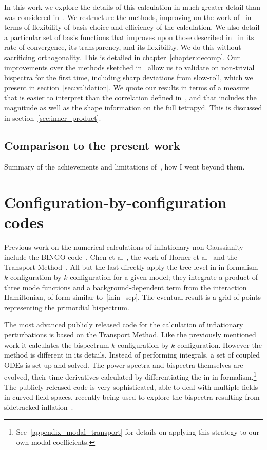 In this work we explore the details of this calculation in much greater detail
than was considered in~\cite{Funakoshi}.
We restructure the methods, improving on the work of~\cite{Funakoshi} in terms
of flexibility of basis choice and efficiency of the calculation.
We also detail a particular set of basis functions that improves upon those described
in~\cite{Funakoshi} in its rate of convergence, its transparency,
and its flexibility.
We do this without sacrificing orthogonality.
This is detailed in chapter~\ref{chapter:decomp}.
Our improvements over the methods sketched in~\cite{Funakoshi} allow us to validate
on non-trivial bispectra for the first time, including sharp deviations from slow-roll, which we present in
section~\ref{sec:validation}.
We quote our results in terms of a measure that is
easier to interpret than the correlation defined in~\cite{Funakoshi},
and that includes the magnitude as well as the shape information
on the full tetrapyd.
This is discussed in section~\ref{sec:inner_product}.
    \subsection{Comparison to the present work}
    Summary of the achievements and limitations of~\cite{Funakoshi}, how I went beyond them.
    \section{Configuration-by-configuration codes}
    Previous work on the numerical calculations of inflationary
non-Gaussianity include the BINGO code~\cite{BINGO},
Chen et al~\cite{chen_easther_lim_1,chen_easther_lim_2},
the work of Horner et al~\cite{horner_methods,horner_ng,horner_cs}
and the Transport Method~\cite{transport_main,transport_pytransport,transport_pytransport_2,transport_curved_3_point}.
All but the last directly apply the tree-level in-in formalism $k$-configuration by $k$-configuration for a given model;
they integrate a product of three mode functions and a background-dependent term from the interaction Hamiltonian, of form similar to~\eqref{inin_sep}.
The eventual result is a grid of points representing the primordial bispectrum.


The most advanced publicly released code for the calculation of inflationary perturbations
is based on the Transport Method.
Like the previously mentioned work it calculates the bispectrum $k$-configuration by $k$-configuration.
However the method is different in its details.
Instead of performing integrals,
a set of coupled ODEs is set up and solved.
The power spectra and bispectra themselves are evolved, their time derivatives calculated by
differentiating the in-in formalism.\footnote{See~\ref{appendix_modal_transport}
    for details on applying this strategy to our own modal coefficients.
    }
The publicly released code is very sophisticated,
able to deal with multiple fields in curved field spaces,
recently being used to explore the bispectra resulting from
sidetracked inflation~\cite{RP_1}.
